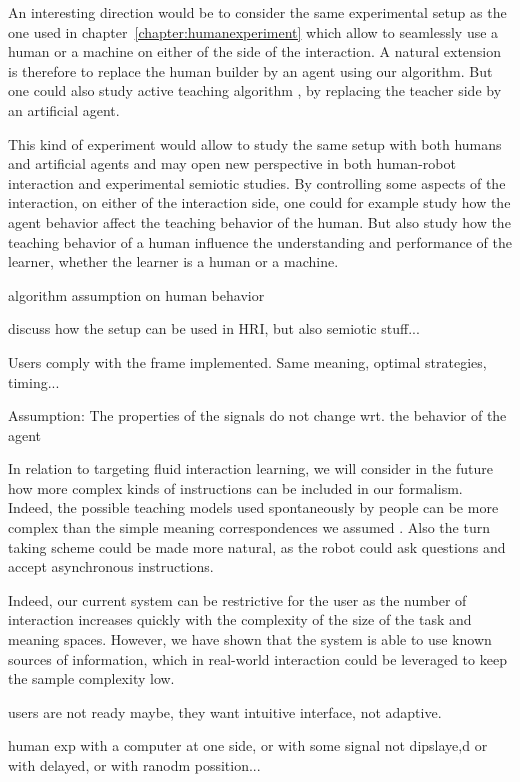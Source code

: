 An interesting direction would be to consider the same experimental setup as the one used in chapter~\ref{chapter:humanexperiment} which allow to seamlessly use a human or a machine on either of the side of the interaction. A natural extension is therefore to replace the human builder by an agent using our algorithm. But one could also study active teaching algorithm \cite{cakmak2012algorithmic}, by replacing the teacher side by an artificial agent.

This kind of experiment would allow to study the same setup with both humans and artificial agents and may open new perspective in both human-robot interaction and experimental semiotic studies. By controlling some aspects of the interaction, on either of the interaction side, one could for example study how the agent behavior affect the teaching behavior of the human. But also study how the teaching behavior of a human influence the understanding and performance of the learner, whether the learner is a human or a machine. 

algorithm assumption on human behavior

discuss how the setup can be used in HRI, but also semiotic stuff...

Users comply with the frame implemented. Same meaning, optimal strategies, timing...

Assumption: The properties of the signals do not change wrt. the behavior of the agent

In relation to targeting fluid interaction learning, we will consider in the future how more complex kinds of instructions can be included in our formalism. Indeed, the possible teaching models used spontaneously by people can be more complex than the simple meaning correspondences we assumed \cite{thomaz2008teachable,Cakmak2010optimality}. Also the turn taking scheme could be made more natural, as the robot could ask questions \cite{cakmak2012designing} and accept asynchronous instructions.

Indeed, our current system can be restrictive for the user as the number of interaction increases quickly with the complexity of the size of the task and meaning spaces. However, we have shown that the system is able to use known sources of information, which in real-world interaction could be leveraged to keep the sample complexity low.

users are not ready maybe, they want intuitive interface, not adaptive.

human exp with a computer at one side, or with some signal not dipslaye,d or with delayed, or with ranodm possition...

